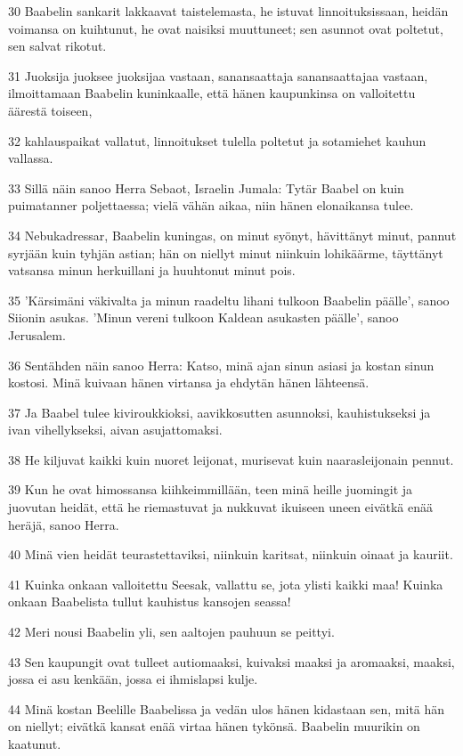 \par 30 Baabelin sankarit lakkaavat taistelemasta, he istuvat linnoituksissaan, heidän voimansa on kuihtunut, he ovat naisiksi muuttuneet; sen asunnot ovat poltetut, sen salvat rikotut.
\par 31 Juoksija juoksee juoksijaa vastaan, sanansaattaja sanansaattajaa vastaan, ilmoittamaan Baabelin kuninkaalle, että hänen kaupunkinsa on valloitettu äärestä toiseen,
\par 32 kahlauspaikat vallatut, linnoitukset tulella poltetut ja sotamiehet kauhun vallassa.
\par 33 Sillä näin sanoo Herra Sebaot, Israelin Jumala: Tytär Baabel on kuin puimatanner poljettaessa; vielä vähän aikaa, niin hänen elonaikansa tulee.
\par 34 Nebukadressar, Baabelin kuningas, on minut syönyt, hävittänyt minut, pannut syrjään kuin tyhjän astian; hän on niellyt minut niinkuin lohikäärme, täyttänyt vatsansa minun herkuillani ja huuhtonut minut pois.
\par 35 'Kärsimäni väkivalta ja minun raadeltu lihani tulkoon Baabelin päälle', sanoo Siionin asukas. 'Minun vereni tulkoon Kaldean asukasten päälle', sanoo Jerusalem.
\par 36 Sentähden näin sanoo Herra: Katso, minä ajan sinun asiasi ja kostan sinun kostosi. Minä kuivaan hänen virtansa ja ehdytän hänen lähteensä.
\par 37 Ja Baabel tulee kiviroukkioksi, aavikkosutten asunnoksi, kauhistukseksi ja ivan vihellykseksi, aivan asujattomaksi.
\par 38 He kiljuvat kaikki kuin nuoret leijonat, murisevat kuin naarasleijonain pennut.
\par 39 Kun he ovat himossansa kiihkeimmillään, teen minä heille juomingit ja juovutan heidät, että he riemastuvat ja nukkuvat ikuiseen uneen eivätkä enää heräjä, sanoo Herra.
\par 40 Minä vien heidät teurastettaviksi, niinkuin karitsat, niinkuin oinaat ja kauriit.
\par 41 Kuinka onkaan valloitettu Seesak, vallattu se, jota ylisti kaikki maa! Kuinka onkaan Baabelista tullut kauhistus kansojen seassa!
\par 42 Meri nousi Baabelin yli, sen aaltojen pauhuun se peittyi.
\par 43 Sen kaupungit ovat tulleet autiomaaksi, kuivaksi maaksi ja aromaaksi, maaksi, jossa ei asu kenkään, jossa ei ihmislapsi kulje.
\par 44 Minä kostan Beelille Baabelissa ja vedän ulos hänen kidastaan sen, mitä hän on niellyt; eivätkä kansat enää virtaa hänen tykönsä. Baabelin muurikin on kaatunut.
